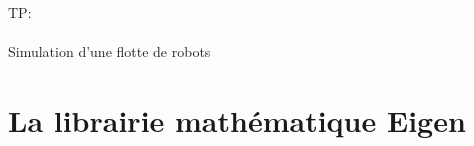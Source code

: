 \documentclass{beamer}
\begin{document}


\begin{frame}
\frametitle{}
\begin{center}
{\Huge TP: ~\\
~\\
Simulation d'une flotte de robots
}
\end{center}
\end{frame}

\section{La librairie mathématique Eigen}
\end{document}
